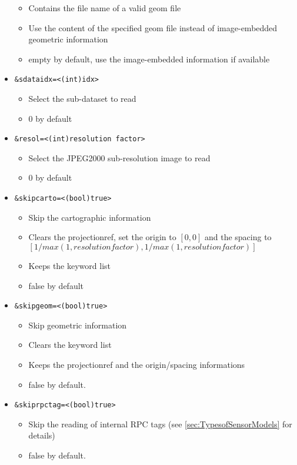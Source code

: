 \begin{itemize}
  \begin{itemize}
  \item Contains the file name of a valid geom file
  \item Use the content of the specified geom file instead of image-embedded
    geometric information
  \item empty by default, use the image-embedded information if available
  \end{itemize}  
\item \begin{verbatim}&sdataidx=<(int)idx>\end{verbatim}
  \begin{itemize}
  \item Select the sub-dataset to read
  \item 0 by default
  \end{itemize}
\item \begin{verbatim}&resol=<(int)resolution factor>\end{verbatim}
  \begin{itemize}
  \item Select the JPEG2000 sub-resolution image to read
  \item 0 by default
  \end{itemize}
\item \begin{verbatim}&skipcarto=<(bool)true>\end{verbatim}
  \begin{itemize}
  \item Skip the cartographic information
  \item Clears the projectionref, set the origin to $[0,0]$ and the spacing to $[1/max(1,resolution factor),1/max(1,resolution factor)]$
  \item Keeps the keyword list
  \item false by default 
  \end{itemize}
\item \begin{verbatim}&skipgeom=<(bool)true>\end{verbatim}
  \begin{itemize}
  \item Skip geometric information
  \item Clears the keyword list
  \item Keeps the projectionref and the origin/spacing informations
  \item false by default. 
  \end{itemize}
\item \begin{verbatim}&skiprpctag=<(bool)true>\end{verbatim}
  \begin{itemize}
  \item Skip the reading of internal RPC tags (see \ref{sec:TypesofSensorModels} for details)
  \item false by default. 
  \end{itemize}
\end{itemize}

